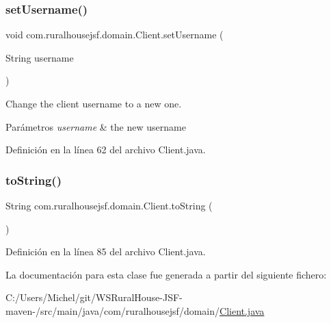 \subsubsection{\texorpdfstring{setUsername()}{setUsername()}}
{\footnotesize\ttfamily void com.\+ruralhousejsf.\+domain.\+Client.\+set\+Username (\begin{DoxyParamCaption}\item[{String}]{username }\end{DoxyParamCaption})}

Change the client username to a new one.


\begin{DoxyParams}{Parámetros}
{\em username} & the new username \\
\hline
\end{DoxyParams}


Definición en la línea 62 del archivo Client.\+java.

\mbox{\label{classcom_1_1ruralhousejsf_1_1domain_1_1_client_a9af93d16608b629f3606f859b0ec85e9}} 
\subsubsection{\texorpdfstring{toString()}{toString()}}
{\footnotesize\ttfamily String com.\+ruralhousejsf.\+domain.\+Client.\+to\+String (\begin{DoxyParamCaption}{ }\end{DoxyParamCaption})}



Definición en la línea 85 del archivo Client.\+java.



La documentación para esta clase fue generada a partir del siguiente fichero\+:\begin{DoxyCompactItemize}
\item 
C\+:/\+Users/\+Michel/git/\+W\+S\+Rural\+House-\/\+J\+S\+F-\/maven-\//src/main/java/com/ruralhousejsf/domain/\mbox{\hyperlink{_client_8java}{Client.\+java}}\end{DoxyCompactItemize}
